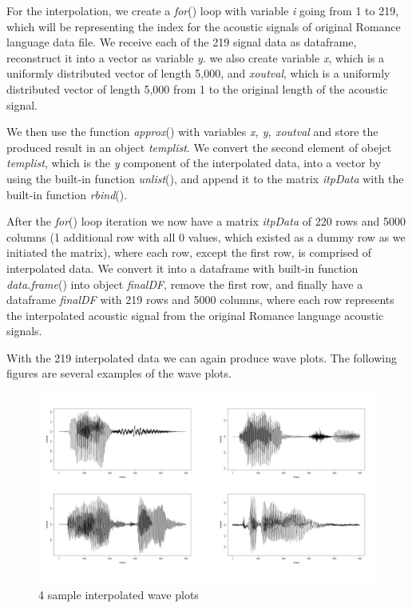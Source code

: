 For the interpolation, we create a \emph{for}() loop with variable \emph{i} going from 1 to 219, which will be representing the index for the acoustic signals of original Romance language data file. We receive each of the 219 signal data as dataframe, reconstruct it into a vector as variable \emph{y}. we also create variable \emph{x}, which is a uniformly distributed vector of length 5,000, and \emph{xoutval}, which is a uniformly distributed vector of length 5,000 from 1 to the original length of the acoustic signal. 

We then use the function \emph{approx}() with variables \emph{x, y, xoutval} and store the produced result in an object \emph{templist}. We convert the second element of obejct \emph{templist}, which is the \emph{y} component of the interpolated data, into a vector by using the built-in function \emph{unlist}(), and append it to the matrix \emph{itpData} with the built-in function \emph{rbind}().

After the \emph{for}() loop iteration we now have a matrix \emph{itpData} of 220 rows and 5000 columns (1 additional row with all 0 values, which existed as a dummy row as we initiated the matrix), where each row, except the first row, is comprised of interpolated data. We convert it into a dataframe with built-in function \emph{data.frame}() into object \emph{finalDF}, remove the first row, and finally have a dataframe \emph{finalDF} with 219 rows and 5000 columns, where each row represents the interpolated acoustic signal from the original Romance language acoustic signals.

With the 219 interpolated data we can again produce wave plots. The following figures are several examples of the wave plots.

\begin{figure}[H]
    \centering
    \includegraphics[width=15cm]{images/Interpolation/4 plot image (Inter).png}
    \caption{4 sample interpolated wave plots}
    \label{fig:4plotinter} 
\end{figure}

